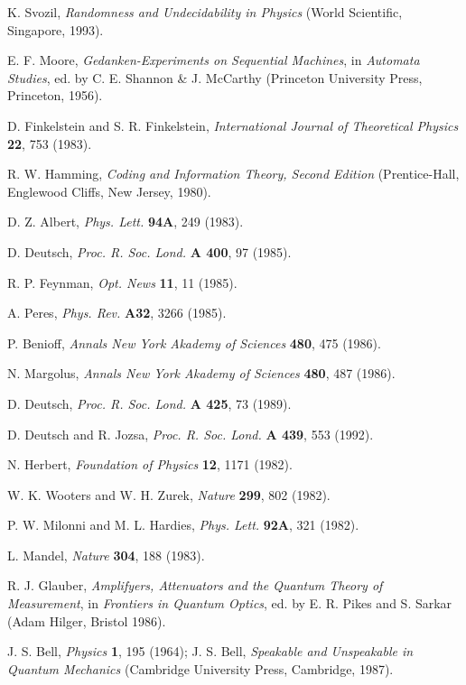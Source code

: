 \begin{thebibliography}{99}
K. Svozil,  {\sl Randomness and Undecidability in Physics}
(World Scientific, Singapore, 1993).

 E. F. Moore, {\sl Gedanken-Experiments on Sequential Machines}, in
 {\sl Automata Studies}, ed. by C. E. Shannon \& J. McCarthy (Princeton
 University Press, Princeton, 1956).

 D. Finkelstein and S. R. Finkelstein,
 {\sl International Journal of Theoretical Physics} {\bf 22}, 753
 (1983).


 R. W. Hamming, {\sl Coding and Information Theory, Second Edition}
 (Prentice-Hall, Englewood Cliffs, New Jersey, 1980).

 D. Z. Albert, {\sl Phys. Lett.} {\bf 94A}, 249 (1983).

 D. Deutsch, {\sl Proc. R. Soc. Lond.} {\bf A 400}, 97 (1985).

R. P. Feynman, {\sl Opt. News} {\bf 11}, 11 (1985).

 A. Peres, {\sl Phys. Rev.} {\bf A32}, 3266 (1985).

 P. Benioff, {\sl Annals New York Akademy of Sciences} {\bf 480}, 475
 (1986).

 N. Margolus, {\sl Annals New York Akademy of Sciences} {\bf 480}, 487
 (1986).

 D. Deutsch, {\sl Proc. R. Soc. Lond.} {\bf A 425}, 73 (1989).

 D. Deutsch and R. Jozsa, {\sl Proc. R. Soc. Lond.} {\bf A 439}, 553
(1992).

N. Herbert, {\sl Foundation of Physics} {\bf 12}, 1171 (1982).

W. K. Wooters and W. H. Zurek,
{\sl Nature} {\bf 299}, 802 (1982).

P. W. Milonni and M. L. Hardies,
{\sl Phys. Lett.} {\bf 92A}, 321 (1982).

L. Mandel,
{\sl Nature} {\bf 304}, 188 (1983).

 R. J. Glauber, {\sl Amplifyers, Attenuators and the Quantum Theory of
 Measurement}, in {\sl Frontiers in Quantum Optics}, ed. by E. R. Pikes
 and S. Sarkar (Adam Hilger, Bristol 1986).

 J. S. Bell, {\sl Physics} {\bf 1}, 195 (1964);
 J. S. Bell, {\sl Speakable and Unspeakable in Quantum Mechanics}
 (Cambridge University Press, Cambridge, 1987).


\end{thebibliography}
